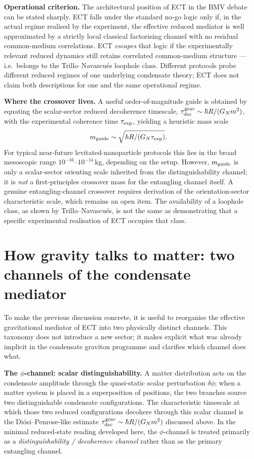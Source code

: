 \documentclass[11pt,a4paper]{article}
\begin{document}
\textbf{Operational criterion.}
The architectural position of ECT in the BMV debate can be stated
sharply. ECT falls under the standard no-go logic only if, in the
actual regime realised by the experiment, the effective reduced
mediator is well approximated by a strictly local classical
factorising channel with no residual common-medium correlations.
ECT \emph{escapes} that logic if the experimentally relevant reduced
dynamics still retains correlated common-medium structure --- i.e.\
belongs to the Trillo--Navascu\'es loophole class. Different
protocols probe different reduced regimes of one underlying
condensate theory; ECT does not claim both descriptions for one and
the same operational regime.

\textbf{Where the crossover lives.}
A useful order-of-magnitude guide is obtained by equating the
scalar-sector reduced decoherence timescale, $\tau^{\rm grav}_{\rm dec}
\sim \hbar R/(G_N m^2)$, with the experimental coherence time
$\tau_{\rm exp}$, yielding a heuristic mass scale
\[
 m_{\rm guide} \sim \sqrt{\hbar R/(G_N \tau_{\rm exp})}.
\]
For typical near-future levitated-nanoparticle protocols this lies in
the broad mesoscopic range $10^{-16}$--$10^{-14}$\,kg, depending on
the setup. However, $m_{\rm guide}$ is only a scalar-sector orienting
scale inherited from the distinguishability channel; it is \emph{not}
a first-principles crossover mass for the entangling channel itself.
A genuine entangling-channel crossover requires derivation of the
orientation-sector characteristic scale, which remains an open item.
The availability of a loophole class, as shown by Trillo--Navascu\'es,
is not the same as demonstrating that a specific experimental
realisation of ECT occupies that class.


\section{How gravity talks to matter: two channels of the condensate mediator}
\label{sec:pop_mediator}

To make the previous discussion concrete, it is useful to reorganise
the effective gravitational mediator of ECT into two physically
distinct channels. This taxonomy does not introduce a new sector;
it makes explicit what was already implicit in the condensate
graviton programme and clarifies which channel does what.

\textbf{The $\phi$-channel: scalar distinguishability.}
A matter distribution acts on the condensate amplitude through the
quasi-static scalar perturbation $\delta\phi$; when a matter system
is placed in a superposition of positions, the two branches source
two distinguishable condensate configurations. The characteristic
timescale at which those two reduced configurations decohere through
this scalar channel is the Di\'osi--Penrose-like estimate
$\tau^{\rm grav}_{\rm dec}\sim\hbar R/(G_N m^2)$ discussed above.
In the minimal reduced-state reading developed here, the $\phi$-channel
is treated primarily as a \emph{distinguishability / decoherence
channel} rather than as the primary entangling channel.
\end{document}
